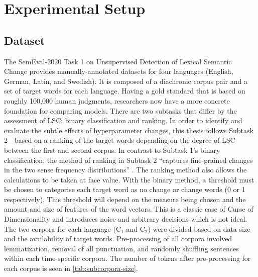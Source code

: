 \section{Experimental Setup}
\label{sec:exp-setup}

\subsection{Dataset}

The SemEval-2020 Task 1 on Unsupervised Detection of Lexical Semantic Change \citep{schlechtweg-etal-2020-semeval} provides manually-annotated datasets for four languages (English, German, Latin, and Swedish). It is composed of a diachronic corpus pair and a set of target words for each language. Having a gold standard that is based on roughly 100,000 human judgments, researchers now have a more concrete foundation for comparing models. There are two subtasks that differ by the assessment of LSC: binary classification and ranking. In order to identify and evaluate the subtle effects of hyperparameter changes, this thesis follows Subtask 2—based on a ranking of the target words depending on the degree of LSC between the first and second corpus. In contrast to Subtask 1’s binary classification, the method of ranking in Subtask 2 “captures fine-grained changes in the two sense frequency distributions” \citep{schlechtweg-etal-2020-semeval}. The ranking method also allows the calculations to be taken at face value. With the binary method, a threshold must be chosen to categorise each target word as no change or change words (0 or 1 respectively). This threshold will depend on the measure being chosen and the amount and size of features of the word vectors. This is a classic case of Curse of Dimensionality and introduces noice and arbitrary decisions which is not ideal. The two corpora for each language (C$_1$ and C$_2$) were divided based on data size and the availability of target words. Pre-processing of all corpora involved lemmatization, removal of all punctuation, and randomly shuffling sentences within each time-specific corpora. The number of tokens after pre-processing for each corpus is seen in \autoref{tab:subcorpora-size}.



